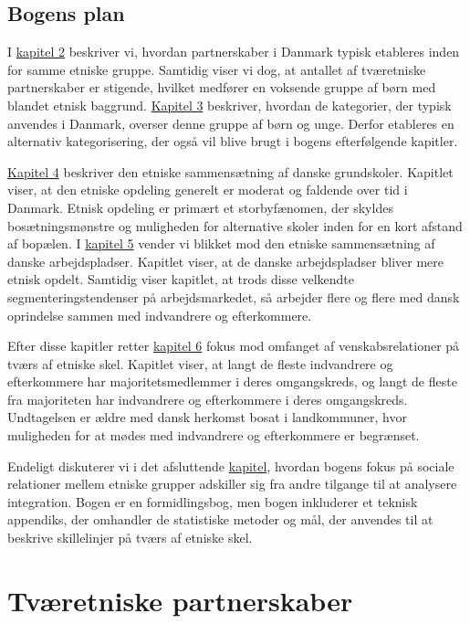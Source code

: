 \documentclass[
]{book}
\begin{document}
\section{Bogens plan}\label{bogens-plan}

I \hyperref[kap2]{kapitel 2} beskriver vi, hvordan partnerskaber i Danmark typisk etableres inden for samme etniske gruppe. Samtidig viser vi dog, at antallet af tværetniske partnerskaber er stigende, hvilket medfører en voksende gruppe af børn med blandet etnisk baggrund. \hyperref[kap3]{Kapitel 3} beskriver, hvordan de kategorier, der typisk anvendes i Danmark, overser denne gruppe af børn og unge. Derfor etableres en alternativ kategorisering, der også vil blive brugt i bogens efterfølgende kapitler.

\hyperref[kap4]{Kapitel 4} beskriver den etniske sammensætning af danske grundskoler. Kapitlet viser, at den etniske opdeling generelt er moderat og faldende over tid i Danmark. Etnisk opdeling er primært et storbyfænomen, der skyldes bosætningsmønstre og muligheden for alternative skoler inden for en kort afstand af bopælen. I \hyperref[kap5]{kapitel 5} vender vi blikket mod den etniske sammensætning af danske arbejdspladser. Kapitlet viser, at de danske arbejdspladser bliver mere etnisk opdelt. Samtidig viser kapitlet, at trods disse velkendte segmenteringstendenser på arbejdsmarkedet, så arbejder flere og flere med dansk oprindelse sammen med indvandrere og efterkommere.

Efter disse kapitler retter \hyperref[kap6]{kapitel 6} fokus mod omfanget af venskabsrelationer på tværs af etniske skel. Kapitlet viser, at langt de fleste indvandrere og efterkommere har majoritetsmedlemmer i deres omgangskreds, og langt de fleste fra majoriteten har indvandrere og efterkommere i deres omgangskreds. Undtagelsen er ældre med dansk herkomst bosat i landkommuner, hvor muligheden for at mødes med indvandrere og efterkommere er begrænset.

Endeligt diskuterer vi i det afsluttende \hyperref[kap7]{kapitel}, hvordan bogens fokus på sociale relationer mellem etniske grupper adskiller sig fra andre tilgange til at analysere integration. Bogen er en formidlingsbog, men bogen inkluderer et teknisk appendiks, der omhandler de statistiske metoder og mål, der anvendes til at beskrive skillelinjer på tværs af etniske skel.

\newpage
\newpage
\thispagestyle{empty}

\chapter{Tværetniske partnerskaber}\label{kap2}
\end{document}
